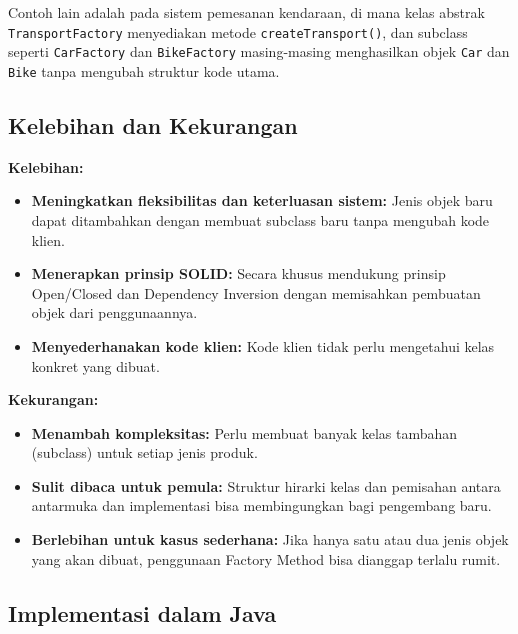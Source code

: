 Contoh lain adalah pada sistem pemesanan kendaraan, di mana kelas abstrak \texttt{TransportFactory} menyediakan metode \texttt{createTransport()}, dan subclass seperti \texttt{CarFactory} dan \texttt{BikeFactory} masing-masing menghasilkan objek \texttt{Car} dan \texttt{Bike} tanpa mengubah struktur kode utama.

\subsection{Kelebihan dan Kekurangan}

\textbf{Kelebihan:}
\begin{itemize}
	\item \textbf{Meningkatkan fleksibilitas dan keterluasan sistem:} Jenis objek baru dapat ditambahkan dengan membuat subclass baru tanpa mengubah kode klien.
	\item \textbf{Menerapkan prinsip SOLID:} Secara khusus mendukung prinsip Open/Closed dan Dependency Inversion dengan memisahkan pembuatan objek dari penggunaannya.
	\item \textbf{Menyederhanakan kode klien:} Kode klien tidak perlu mengetahui kelas konkret yang dibuat.
\end{itemize}

\textbf{Kekurangan:}
\begin{itemize}
	\item \textbf{Menambah kompleksitas:} Perlu membuat banyak kelas tambahan (subclass) untuk setiap jenis produk.
	\item \textbf{Sulit dibaca untuk pemula:} Struktur hirarki kelas dan pemisahan antara antarmuka dan implementasi bisa membingungkan bagi pengembang baru.
	\item \textbf{Berlebihan untuk kasus sederhana:} Jika hanya satu atau dua jenis objek yang akan dibuat, penggunaan Factory Method bisa dianggap terlalu rumit.
\end{itemize}

\subsection{Implementasi dalam Java}


